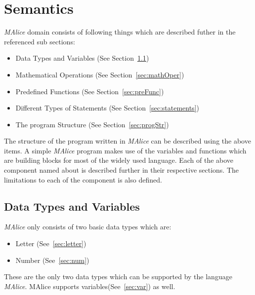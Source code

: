 \documentclass[a4wide, 11pt]{article}
\begin{document}
\section{Semantics}
\label{sec:semantics}
	\emph{MAlice} domain consists of following things which are described futher in the
		referenced sub sections:
	\begin{itemize}
		\item Data Types and Variables (See Section~\ref{sec:dtypes})
		\item Mathematical Operations (See Section~\ref{sec:mathOper})
		\item Predefined Functions (See Section~\ref{sec:preFunc})
		\item Different Types of Statements (See Section~\ref{sec:statements})
		\item The program Structure (See Section~\ref{sec:progStr}) 
	\end{itemize}
	The structure of the program written in \emph{MAlice} can be described using the above items. A simple
	\emph{MAlice} program makes use of the variables and functions which are building blocks
	for most of the widely used language. Each of the above component named about is described further
	in their respective sections. The limitations to each of the component is also defined.

	\subsection{Data Types and Variables}
	\label{sec:dtypes}
		\emph{MAlice} only consists of two basic data types which are:
		\begin{itemize}
			\item Letter (See~\ref{sec:letter})
			\item Number (See~\ref{sec:num})
		\end{itemize}
		These are the only two data types which can be supported by the language \emph{MAlice}. MAlice
		supports variables(See~\ref{sec:var}) as well.
\end{document}
